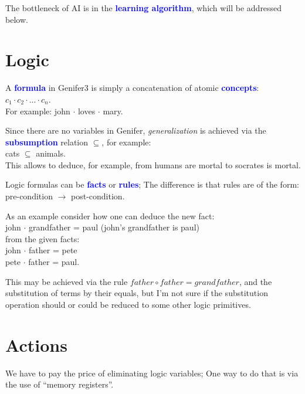 \documentclass[12pt]{article}
\newcommand{\concept}[1]{\textbf{\textcolor{blue}{#1}}}
\newcommand{\formula}[1]{\ttfamily\textcolor{LogicColor}{#1}\rmfamily}
\newcommand{\tab}{\hspace*{1cm}}
\begin{document}
The bottleneck of AI is in the \concept{learning algorithm}, which will be addressed below.

\section{Logic}

A \concept{formula} in Genifer3 is simply a concatenation of atomic \concept{concepts}:\\
\tab $c_1 \cdot c_2 \cdot ... \cdot c_n$.\\
For example:  \formula{john $\cdot$ loves $\cdot$ mary}.

Since there are no variables in Genifer, \textit{generalization} is achieved via the \concept{subsumption} relation $\subseteq$, for example:\\
\tab \formula{cats $\subseteq$ animals}.\\
This allows to deduce, for example, from \formula{humans are mortal} to \formula{socrates is mortal}.

Logic formulas can be \concept{facts} or \concept{rules};  The difference is that rules are of the form:\\
\tab \formula{pre-condition $\rightarrow$ post-condition}.

As an example consider how one can deduce the new fact:\\
\tab \formula{john $\cdot$ grandfather = paul} \tab (john's grandfather is paul)\\
from the given facts:\\
\tab \formula{john $\cdot$ father = pete}\\
\tab \formula{pete $\cdot$ father = paul}.

This may be achieved via the rule $father \circ father = grandfather$, and the substitution of terms by their equals, but I'm not sure if the substitution operation should or could be reduced to some other logic primitives.

\section{Actions}

We have to pay the price of eliminating logic variables;  One way to do that is via the use of ``memory registers''.
\end{document}
